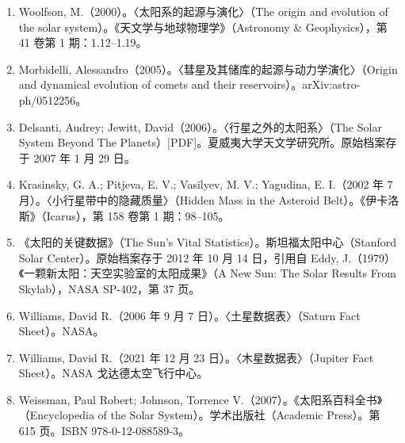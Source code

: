 \begin{enumerate}
\item Woolfson, M.（2000）。〈太阳系的起源与演化〉（The origin and evolution of the solar system）。《天文学与地球物理学》（Astronomy & Geophysics），第 41 卷第 1 期：1.12–1.19。
\item Morbidelli, Alessandro（2005）。〈彗星及其储库的起源与动力学演化〉（Origin and dynamical evolution of comets and their reservoirs）。arXiv:astro-ph/0512256。
\item Delsanti, Audrey; Jewitt, David（2006）。〈行星之外的太阳系〉（The Solar System Beyond The Planets）[PDF]。夏威夷大学天文学研究所。原始档案存于 2007 年 1 月 29 日。
\item Krasinsky, G. A.; Pitjeva, E. V.; Vasilyev, M. V.; Yagudina, E. I.（2002 年 7 月）。〈小行星带中的隐藏质量〉（Hidden Mass in the Asteroid Belt）。《伊卡洛斯》（Icarus），第 158 卷第 1 期：98–105。
\item 《太阳的关键数据》（The Sun's Vital Statistics）。斯坦福太阳中心（Stanford Solar Center）。原始档案存于 2012 年 10 月 14 日，引用自 Eddy, J.（1979）《一颗新太阳：天空实验室的太阳成果》（A New Sun: The Solar Results From Skylab），NASA SP-402，第 37 页。
\item Williams, David R.（2006 年 9 月 7 日）。〈土星数据表〉（Saturn Fact Sheet）。NASA。
\item Williams, David R.（2021 年 12 月 23 日）。〈木星数据表〉（Jupiter Fact Sheet）。NASA 戈达德太空飞行中心。
\item Weissman, Paul Robert; Johnson, Torrence V.（2007）。《太阳系百科全书》（Encyclopedia of the Solar System）。学术出版社（Academic Press）。第 615 页。ISBN 978-0-12-088589-3。

\end{enumerate}